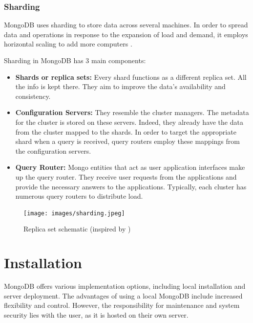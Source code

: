 \subsubsection{Sharding}

MongoDB uses sharding to store data across several machines. In order to spread data and operations in response to the expansion of load and demand, it employs horizontal scaling to add more computers \parencite{roy_databases_2020}.

Sharding in MongoDB has 3 main components:

\begin{itemize}
    \item \textbf{Shards or replica sets:} Every shard functions as a different replica set. All the info is kept there. They aim to improve the data's availability and consistency.
    \item \textbf{Configuration Servers:} They resemble the cluster managers. The metadata for the cluster is stored on these servers. Indeed, they already have the data from the cluster mapped to the shards. In order to target the appropriate shard when a query is received, query routers employ these mappings from the configuration servers.
    \item \textbf{Query Router:} Mongo entities that act as user application interfaces make up the query router. They receive user requests from the applications and provide the necessary answers to the applications. Typically, each cluster has numerous query routers to distribute load.
\end{itemize}

\begin{figure}[H]
    \centering
    \caption[Replica set schematic]{Replica set schematic (inspired by \textcite{mongodb_sharding})} \label{fig:Sharding}
    \texttt{[image: images/sharding.jpeg]}
\end{figure}

\section{Installation}

MongoDB offers various implementation options, including local installation and server deployment. The advantages of using a local MongoDB include increased flexibility and control. However, the responsibility for maintenance and system security lies with the user, as it is hosted on their own server. \parencite{mujdrica_whatismongodb}

